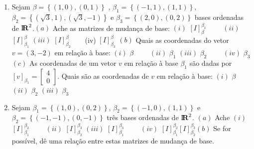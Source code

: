 \documentclass{report}
\begin{document}
\begin{Exercise}
\begin{enumerate}
\item \label{34lista3} Sejam $\beta =\left\{ \left( 1,0\right) ,\left( 0,1\right) \right\} $%
, $\beta _{1}=\left\{ \left( -1,1\right) ,\left( 1,1\right) \right\} $, $%
\beta _{2}=\left\{ \left( \sqrt{3},1\right) ,\left( \sqrt{3},-1\right)
\right\} $ e $\beta _{3}=\left\{ \left( 2,0\right) ,\left( 0,2\right)
\right\} $ bases ordenadas de $%
\mbox{${\rm I}\!\mbox{\boldmath $ {\rm R}$}$}%
^{2}$.\newline $(a)$ Ache as matrizes de mudan\c{c}a de
base:\newline
\qquad \qquad $(i)$ $\left[ I\right] _{\beta }^{\beta _{1}}\qquad $ $(ii)$ $%
\left[ I\right] _{\beta _{1}}^{\beta }$ \qquad $(iii)$ $\left[
I\right]
_{\beta _{2}}^{\beta }\qquad $(iv) $\left[ I\right] _{\beta _{3}}^{\beta }$%
\newline
$(b)$ Quais as coordenadas do vetor $v=(3,-2)$ em rela\c{c}\~{a}o \`{a} base:%
\newline
\qquad \qquad $(i)$ $\beta \qquad $ $(ii)$ $\beta _{1}$ \qquad
$(iii)$ $\beta _{2}\qquad $ $(iv)$ $\beta _{3}$\newline $(c)$ As
coordenadas de um vetor $v$ em rela\c{c}\~{a}o \`{a} base $\beta
_{1}$ s\~{a}o dadas por $\left[ v\right] _{\beta _{1}}=\left[
\begin{array}{l}
4 \\
0
\end{array}
\right] $. Quais s\~{a}o as coordenadas de $v$ em rela\c{c}\~{a}o \`{a} base:%
\newline
\qquad \qquad $(i)$ $\beta \qquad $ $(ii)$ $\beta _{2}$ \qquad
$(iii)$ $\beta _{3}$


\item \label{35lista3} Sejam $\beta _{1}=\left\{ \left( 1,0\right)
,\left( 0,2\right) \right\} $, $\beta _{2}=\left\{ \left(
-1,0\right) ,\left( 1,1\right) \right\} $ e $\beta _{2}=\left\{
\left( -1,-1\right) ,\left( 0,-1\right)
\right\}$ tr\^{e}s bases ordenadas de $%
\mbox{${\rm I}\!\mbox{\boldmath $ {\rm R}$}$}%
^{2}$. \newline $(a)$ Ache\newline
\qquad \qquad $(i)$ $\left[ I\right] _{\beta _{1}}^{\beta _{2}}\qquad $ $(ii)$ $%
\left[ I\right] _{\beta _{2}}^{\beta _{3}}$ \qquad $(iii)$ $\left[
I\right] _{\beta _{1}}^{\beta _{3}}\qquad $ $(iv)$ $\left[
I\right] _{\beta _{1}}^{\beta _{2}}\left[ I\right] _{\beta
_{2}}^{\beta _{3}}$\newline $(b)$ Se for poss\'{i}vel, d\^{e} uma
rela\c{c}\~{a}o entre estas matrizes de mudan\c{c}a de base.

\end{enumerate}

\end{Exercise}
\end{document}
